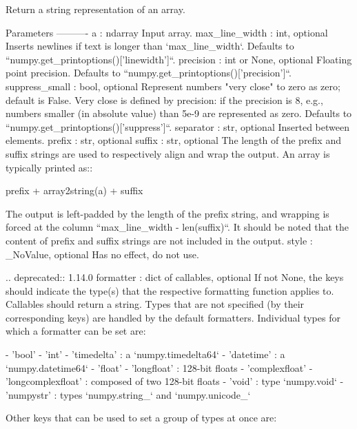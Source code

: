 \begin{DoxyVerb}Return a string representation of an array.

Parameters
----------
a : ndarray
    Input array.
max_line_width : int, optional
    Inserts newlines if text is longer than `max_line_width`.
    Defaults to ``numpy.get_printoptions()['linewidth']``.
precision : int or None, optional
    Floating point precision.
    Defaults to ``numpy.get_printoptions()['precision']``.
suppress_small : bool, optional
    Represent numbers "very close" to zero as zero; default is False.
    Very close is defined by precision: if the precision is 8, e.g.,
    numbers smaller (in absolute value) than 5e-9 are represented as
    zero.
    Defaults to ``numpy.get_printoptions()['suppress']``.
separator : str, optional
    Inserted between elements.
prefix : str, optional
suffix : str, optional
    The length of the prefix and suffix strings are used to respectively
    align and wrap the output. An array is typically printed as::

      prefix + array2string(a) + suffix

    The output is left-padded by the length of the prefix string, and
    wrapping is forced at the column ``max_line_width - len(suffix)``.
    It should be noted that the content of prefix and suffix strings are
    not included in the output.
style : _NoValue, optional
    Has no effect, do not use.

    .. deprecated:: 1.14.0
formatter : dict of callables, optional
    If not None, the keys should indicate the type(s) that the respective
    formatting function applies to.  Callables should return a string.
    Types that are not specified (by their corresponding keys) are handled
    by the default formatters.  Individual types for which a formatter
    can be set are:

    - 'bool'
    - 'int'
    - 'timedelta' : a `numpy.timedelta64`
    - 'datetime' : a `numpy.datetime64`
    - 'float'
    - 'longfloat' : 128-bit floats
    - 'complexfloat'
    - 'longcomplexfloat' : composed of two 128-bit floats
    - 'void' : type `numpy.void`
    - 'numpystr' : types `numpy.string_` and `numpy.unicode_`

    Other keys that can be used to set a group of types at once are:


\end{DoxyVerb}
